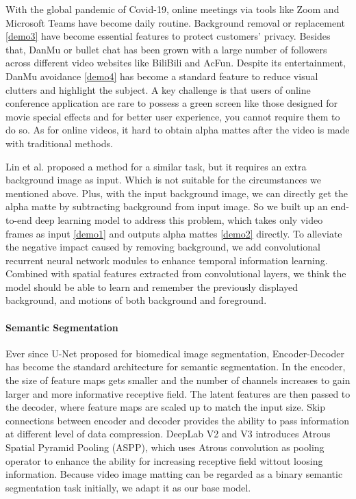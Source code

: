 \documentclass[final]{cvpr}
\begin{document}
With the global pandemic of Covid-19, online meetings via tools like Zoom and Microsoft Teams have become daily routine.
Background removal or replacement \ref{demo3} have become essential features to protect customers' privacy.
Besides that, DanMu or bullet chat has been grown with a large number of followers across different video websites like BiliBili and AcFun.
Despite its entertainment, DanMu avoidance \ref{demo4} has become a standard feature to reduce visual clutters and highlight the subject.
A key challenge is that users of online conference application are rare to possess a green screen like those designed for movie special effects and for better user experience, you cannot require them to do so. As for online videos, it hard to obtain alpha mattes after the video is made with traditional methods.

Lin et al. \cite{linRealTimeHighResolutionBackground2020a} proposed a method for a similar task, but it requires an extra background image as input.
Which is not suitable for the circumstances we mentioned above.
Plus, with the input background image, we can directly get the alpha matte by subtracting background from input image.
So we built up an end-to-end deep learning model to address this problem, which takes only video frames as input \ref{demo1} and outputs alpha mattes \ref{demo2} directly.
To alleviate the negative impact caused by removing background, we add convolutional recurrent neural network modules to enhance temporal information learning.
Combined with spatial features extracted from convolutional layers, we think the model should be able to learn and remember the previously displayed background, and motions of both background and foreground.

\paragraph{Semantic Segmentation}

Ever since U-Net \cite{Ronneberger2015UNetCN} proposed for biomedical image segmentation, Encoder-Decoder has become the standard architecture for semantic segmentation.
In the encoder, the size of feature maps gets smaller and the number of channels increases to gain larger and more informative receptive field.
The latent features are then passed to the decoder, where feature maps are scaled up to match the input size.
Skip connections between encoder and decoder provides the ability to pass information at different level of data compression.
DeepLab V2 \cite{Chen2018DeepLabSI} and V3 \cite{chenRethinkingAtrousConvolution2017} introduces Atrous Spatial Pyramid Pooling (ASPP), which uses Atrous convolution as pooling operator to enhance the ability for increasing receptive field wittout loosing information.
Because video image matting can be regarded as a binary semantic segmentation task initially, we adapt it as our base model.
\end{document}
